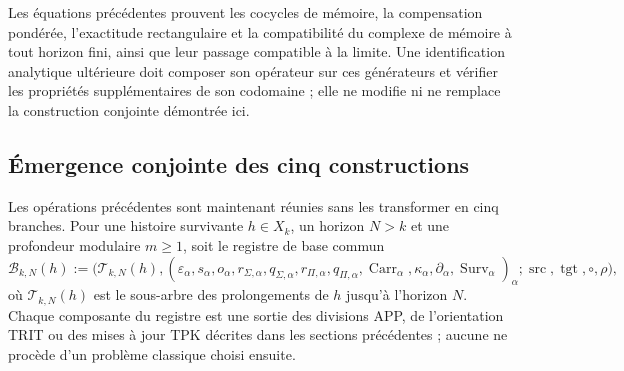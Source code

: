 Les équations précédentes prouvent les cocycles de mémoire, la compensation
pondérée, l'exactitude rectangulaire et la compatibilité du complexe de
mémoire à tout horizon fini, ainsi que leur passage compatible à la limite.
Une identification analytique ultérieure doit composer son opérateur sur ces
générateurs et vérifier les propriétés supplémentaires de son codomaine ; elle ne
modifie ni ne remplace la construction conjointe démontrée ici.

\iffalse
\subsection{Émergence conjointe des cinq constructions}
\label{hmtfg:base:sec:cinco-construcciones-continuo-ch}

Les opérations précédentes sont maintenant réunies sans les transformer en cinq branches. Pour une histoire survivante \(h\in X_k\), un horizon \(N>k\) et une profondeur modulaire \(m\geq1\), soit le registre de base commun
\[
 \mathcal B_{k,N}(h):=
 \bigl(\mathscr T_{k,N}(h),
       (\varepsilon_\alpha,s_\alpha,o_\alpha,
        r_{\Sigma,\alpha},q_{\Sigma,\alpha},
        r_{\Pi,\alpha},q_{\Pi,\alpha},
        \operatorname{Carr}_\alpha,
        \kappa_\alpha,\partial_\alpha,
        \operatorname{Surv}_\alpha)_\alpha;
       \operatorname{src},\operatorname{tgt},\circ,\rho\bigr),
 \tag{C1}
 \label{hmtfg:base:eq:base-comun-registros}
\]
où \(\mathscr T_{k,N}(h)\) est le sous-arbre des prolongements de \(h\)
jusqu'à l'horizon \(N\). Chaque composante du registre est une sortie des
divisions APP, de l'orientation TRIT ou des mises à jour TPK décrites
dans les sections précédentes ; aucune ne procède d'un problème classique choisi
ensuite.

